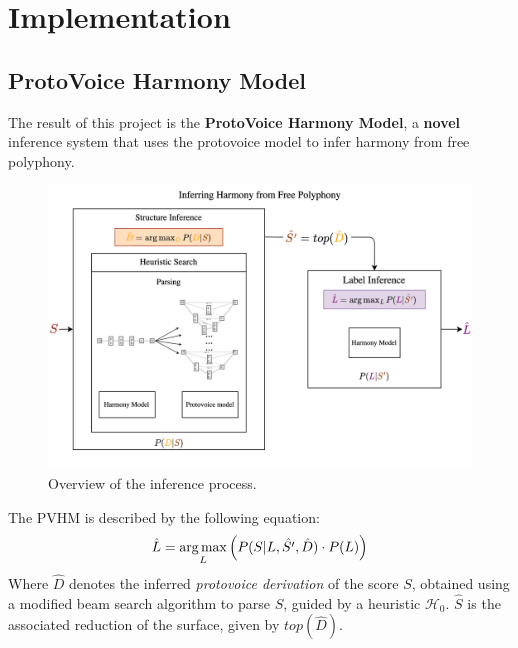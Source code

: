 \documentclass[12pt,a4paper,twoside,openright]{report}
\DeclareMathOperator*{\argmax}{arg\,max}
\theoremstyle{definition}
\begin{document}

\chapter{Implementation}

\section{ProtoVoice Harmony Model}

The result of this project is the \textbf{ProtoVoice Harmony Model}, a \textbf{novel} inference system that uses the protovoice model to infer harmony from free polyphony.

\begin{figure}[h]
  \centering
  \includegraphics[width=\textwidth]{intro/inferenceOverview}
  \caption{Overview of the inference process.}
  \label{fig:inferenceOverview}
\end{figure}

The PVHM is described by the following equation: 
\begin{equation}
  \label{eq:pvhmSuccinct}
  \begin{aligned}
    \hat{L} &= \argmax_L 
            \left( P(S|L,\hat{S'},\hat{D})\cdot P(L)\right) \\
  \end{aligned} \\
\end{equation}
Where $\hat{D}$ denotes the inferred \textit{protovoice derivation} of the score $S$, obtained using a modified beam search algorithm to parse $S$, guided by a heuristic $\mathcal{H_0}$.  
$\hat{S}$ is the associated reduction of the surface, given by $top(\hat{D})$. 
\end{document}
